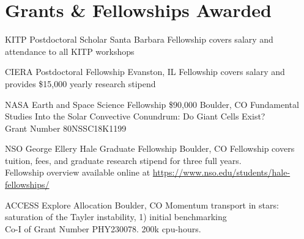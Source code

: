 \section{Grants \& Fellowships Awarded}


		{KITP Postdoctoral Scholar}
		{}
		{Santa Barbara}
		{}
		{Fellowship covers salary and attendance to all KITP workshops}

		{CIERA Postdoctoral Fellowship}
		{}
		{Evanston, IL}
		{}
		{Fellowship covers salary and provides \$15,000 yearly research stipend}

		{NASA Earth and Space Science Fellowship}
		{\$90,000}
		{Boulder, CO}
		{}
		{Fundamental Studies Into the Solar Convective Conundrum: Do Giant Cells Exist?\\
		 Grant Number 80NSSC18K1199}

		{NSO George Ellery Hale Graduate Fellowship}
		{}
		{Boulder, CO}
		{}
		{Fellowship covers tuition, fees, and graduate research stipend for three full years.\\
		 Fellowship overview available online at \href{https://www.nso.edu/students/hale-fellowships/}{https://www.nso.edu/students/hale-fellowships/}}


		{ACCESS Explore Allocation}
		{}
		{Boulder, CO}
		{}
		{Momentum transport in stars: saturation of the Tayler instability, 1) initial benchmarking\\
        Co-I of Grant Number PHY230078. 200k cpu-hours.}


